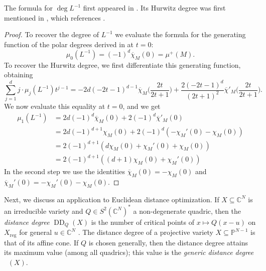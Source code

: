 \documentclass[12pt,a4paper,english]{scrartcl}
\newcommand{\CC}{\mathbb{C}}
\newcommand{\PP}{\mathbb{P}}
\newcommand{\reg}{\mathrm{reg}}
\DeclareMathOperator{\DD}{DD}
\DeclareMathOperator{\DDgen}{DD_{gen}}
\begin{document}
The formula for $\deg L^{-1}$ first appeared in \cite{orlik1992arrangements}.
Its Hurwitz degree was first mentioned in \cite[Example 4.1]{sturmfels2016hurwitzformprojectivevariety}, which references \cite[Proof of Proposition 33]{Sanyal2013}.

\begin{proof}
To recover the degree of $L^{-1}$ we evaluate the formula for the generating function of the polar degrees derived in  at $t=0$:
\[
\mu_0(L^{-1}) = (-1)^d\overline{\chi}_M(0) = \mu^+(M).
\]
To recover the Hurwitz degree, we first differentiate this generating function, obtaining
\[
\sum_{j=1}^dj\cdot \mu_j(L^{-1})t^{j-1} = -2d(-2t-1)^{d-1} \overline{\chi}_M\bigg(\frac{2t}{2t+1}\bigg) + \frac{2(-2t-1)^d}{(2t+1)^2} \overline{\chi}'_M\bigg(\frac{2t}{2t+1}\bigg).
\]
We now evaluate this equality at $t=0$, and we get
\begin{align*}
\mu_1(L^{-1}) &= 2d(-1)^{d}\overline{\chi}_M(0) + 2(-1)^{d}\overline{\chi}'_M(0)\\ 
&= 2d(-1)^{d+1}\chi_M(0) + 2(-1)^d(-\chi_M'(0)-\chi_M(0)) \\
&= 2(-1)^{d+1}(d\chi_M(0)+\chi_M'(0)+\chi_M(0)) \\
&= 2(-1)^{d+1}((d+1)\chi_M(0)+\chi_M'(0))
\end{align*}
In the second step we use the identities $\overline{\chi}_M(0) = -\chi_M(0)$ and $\overline{\chi}_M'(0) = -\chi_M'(0) - \chi_M(0)$.
\end{proof}

Next, we discuss an application to Euclidean distance optimization. If $X \subseteq \CC^N$ is an irreducible variety and $Q \in S^2(\CC^N)^*$ a non-degenerate quadric, then the \emph{distance degree} $\DD_Q(X)$ is the number of critical points of $x \mapsto Q(x-u)$ on $X_\reg$ for general $u \in \CC^N$ \cite{Draisma2015}. The distance degree of a projective variety $X \subseteq \PP^{N-1}$ is that of its affine cone. If $Q$ is chosen generally, then the distance degree attains its maximum value (among all quadrics); this value is the \emph{generic distance degree} $\DDgen(X)$.
\end{document}
